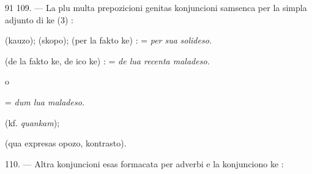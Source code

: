 \begin{VUpage}[95]{91}
\VUblanc{8.24pt}%
109. --- La plu multa prepozicioni genitas konjuncioni\nl
samsenca per la simpla adjunto di ke (3) :

\VUblanc{1.49pt}%
 (kauzo);  (skopo);  (per la fakto\nl
ke) :  = \textit{per sua}\nl
\textit{solideso.}

 (de la fakto ke, de ico ke) : \nl
{} = \textit{de lua recenta maladeso.}

 o \nl
{}

 = \textit{dum lua maladeso.}


 (kf. \textit{quankam}); 

 (qua expresas opozo, kontrasto).

\VUblanc{8.24pt}%
110. --- Altra konjuncioni esas formacata per adverbi e\nl
la konjunciono ke :

\VUblanc{1.61pt}%
\parplein
\end{VUpage}

